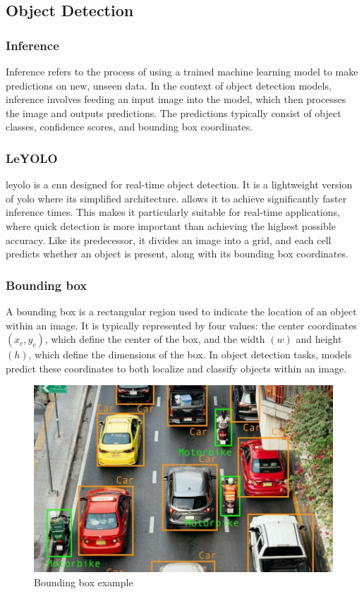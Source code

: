 \subsection{Object Detection}

\subsubsection*{Inference} 
Inference refers to the process of using a trained machine learning model to make predictions on new, unseen data. In the context of object detection models, inference involves feeding an input image into the model, which then processes the image and outputs predictions. The predictions typically consist of object classes, confidence scores, and bounding box coordinates.\cite{nvidia:inference}

\subsubsection*{LeYOLO} 
\gls{leyolo} is a \gls{cnn} designed for real-time object detection. It is a lightweight version of \gls{yolo} where its simplified architecture. allows it to achieve significantly faster inference times. This makes it particularly suitable for real-time applications, where quick detection is more important than achieving the highest possible accuracy. Like its predecessor, it divides an image into a grid, and each cell predicts whether an object is present, along with its bounding box coordinates.\cite{openreview:leyolo}\\

\subsubsection*{Bounding box} 
A bounding box is a rectangular region used to indicate the location of an object within an image. It is typically represented by four values: the center coordinates \((x_c, y_c)\), which define the center of the box, and  the width \((w)\) and height \((h)\), which define the dimensions of the box. In object detection tasks, models predict these coordinates to both localize and classify objects within an image. \cite{peopleforai:boundingbox}

\begin{figure}[h!]
    \centering
    \includegraphics[width=0.75\linewidth]{figures/theory/image-recognition/bbox-example.png}
    \caption[Bounding box example]{Bounding box example \cite{peopleforai:boundingbox}}
    \label{fig:boundingbox}
\end{figure}


